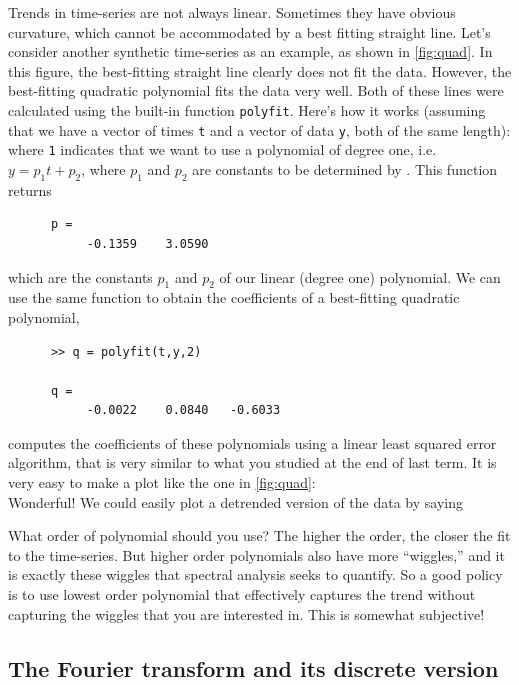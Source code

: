 \documentclass[11pt,twoside,a4paper]{article}
\begin{document}
Trends in time-series are not always linear.  Sometimes they have
obvious curvature, which cannot be accommodated by a best fitting
straight line.  Let's consider another synthetic time-series as an
example, as shown in \autoref{fig:quad}.  In this figure, the
best-fitting straight line clearly does not fit the data. However, the
best-fitting quadratic polynomial fits the data very well.  Both of
these lines were calculated using the \Mlab built-in function
\texttt{polyfit}. Here's how it works (assuming that we have a vector of
times \texttt{t} and a vector of data \texttt{y}, both of the same length):
\\
where \texttt{1} indicates that we want to use a polynomial of
degree one, i.e.~$y=p_1t + p_2$, where $p_1$ and $p_2$ are constants
to be determined by \Mlab.  This function returns
\begin{verbatim}
      p = 
           -0.1359    3.0590
\end{verbatim}
which are the constants $p_1$ and $p_2$ of our linear (degree one)
polynomial.  We can use the same function to obtain the coefficients
of a best-fitting quadratic polynomial,
\begin{verbatim}
      >> q = polyfit(t,y,2)

      q =
           -0.0022    0.0840   -0.6033
\end{verbatim}
\Mlab computes the coefficients of these polynomials using a linear
least squared error algorithm, that is very similar to what you
studied at the end of last term.  It is very easy to make a plot like
the one in \autoref{fig:quad}:
\\
Wonderful!  We could easily plot a detrended version of the data by saying

What order of polynomial should you use?  The higher the order, the
closer the fit to the time-series.  But higher order polynomials also
have more ``wiggles,'' and it is exactly these wiggles that spectral
analysis seeks to quantify.  So a good policy is to use lowest order
polynomial that effectively captures the trend without capturing the
wiggles that you are interested in.  This is somewhat subjective!

\subsection{The Fourier transform and its discrete version}
\end{document}

